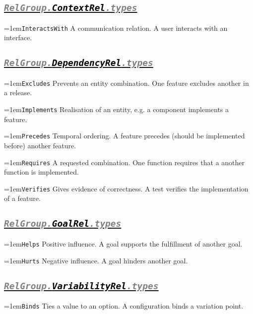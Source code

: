 \documentclass[a4paper,oneside]{article}
\newcommand\Concept[2]{\hangindent=1em\lstinline+#1+ #2}
\begin{document}
\begin{multicols*}{4}
\subsection*{\underline{\texttt{\textit{{\textcolor{gray}{RelGroup.}\textcolor{black}{ContextRel}}\textcolor{gray}{.types}}}}}
\Concept{InteractsWith}{A communication relation. A user interacts with an interface.}


\subsection*{\underline{\texttt{\textit{{\textcolor{gray}{RelGroup.}\textcolor{black}{DependencyRel}}\textcolor{gray}{.types}}}}}
\Concept{Excludes}{Prevents an entity combination. One feature excludes another in a release.}

\Concept{Implements}{Realisation of an entity, e.g. a component implements a feature.}

\Concept{Precedes}{Temporal ordering. A feature precedes (should be implemented before) another feature.}

\Concept{Requires}{A requested combination. One function requires that a another function is implemented.}

\Concept{Verifies}{Gives evidence of correctness. A test verifies the implementation of a feature.}


\subsection*{\underline{\texttt{\textit{{\textcolor{gray}{RelGroup.}\textcolor{black}{GoalRel}}\textcolor{gray}{.types}}}}}
\Concept{Helps}{Positive influence. A goal supports the fulfillment of another goal.}

\Concept{Hurts}{Negative influence. A goal hinders another goal.}


\subsection*{\underline{\texttt{\textit{{\textcolor{gray}{RelGroup.}\textcolor{black}{VariabilityRel}}\textcolor{gray}{.types}}}}}
\Concept{Binds}{Ties a value to an option. A configuration binds a variation point.}


\end{multicols*}
\end{document}
